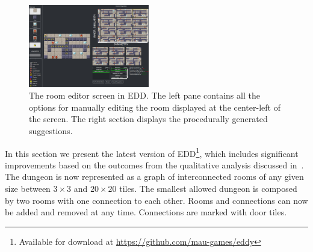 
\begin{figure}[t]
\centerline{\includegraphics[width=0.47\textwidth]{figures/figure1.png}}
\caption{The room editor screen in EDD. The left pane contains all the options for manually editing the room displayed at the center-left of the screen. The right section displays the procedurally generated suggestions.}
\label{figs:roomscreen}
\end{figure}

In this section we present the latest version of EDD\footnote{Available for download at \url{https://github.com/mau-games/eddy}}, which includes significant improvements based on the outcomes from the qualitative analysis discussed in~\cite{p6Alvarez2018}. The dungeon is now represented as a graph of interconnected rooms of any given size between $3\times3$ and $20\times20$ tiles. The smallest allowed dungeon is composed by two rooms with one connection to each other. Rooms and connections can now be added and removed at any time. Connections are marked with door tiles.




